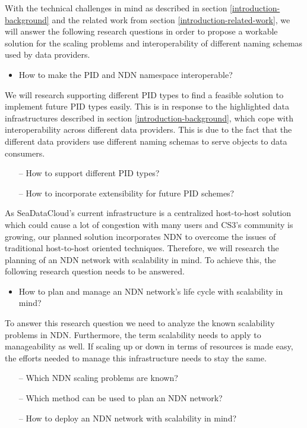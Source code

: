 With the technical challenges in mind as described in section \ref{introduction-background} and the related work from section \ref{introduction-related-work}, we will answer the following research questions in order to propose a workable solution for the scaling problems and interoperability of different naming schemas used by data providers. 

\begin{itemize}
	\item How to make the PID and NDN namespace interoperable?
\end{itemize}

We will research supporting different PID types to find a feasible solution to implement future PID types easily. This is in response to the highlighted data infrastructures described in section \ref{introduction-background}, which cope with interoperability across different data providers. This is due to the fact that the different data providers use different naming schemas to serve objects to data consumers. 
\begin{itemize}
    \item[--] How to support different PID types?
    \item[--] How to incorporate extensibility for future PID schemes?
\end{itemize}


As SeaDataCloud's current infrastructure is a centralized host-to-host solution 
which could cause a lot of congestion with many users and CS3's community is growing,
our planned solution incorporates NDN to overcome the issues of traditional host-to-host oriented techniques. Therefore, we will research the planning of an NDN network with scalability in mind. To achieve this, the following research question needs to be answered.   
\begin{itemize}
    \item How to plan and manage an NDN network's life cycle with scalability in mind?
\end{itemize}

To answer this research question we need to analyze the known scalability problems in NDN. Furthermore, the term scalability needs to apply to manageability as well. If scaling up or down in terms of resources is made easy, the efforts needed to manage this infrastructure needs to stay the same.
\begin{itemize}
    \item[--] Which NDN scaling problems are known?
    \item[--] Which method can be used to plan an NDN network?
    \item[--] How to deploy an NDN network with scalability in mind?
\end{itemize}

